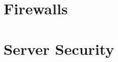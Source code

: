 \documentclass{article}
\begin{document}
\section{Firewalls}
\label{sec:firewalls}







\section{Server Security}
\label{sec:serversec}


\end{document}
